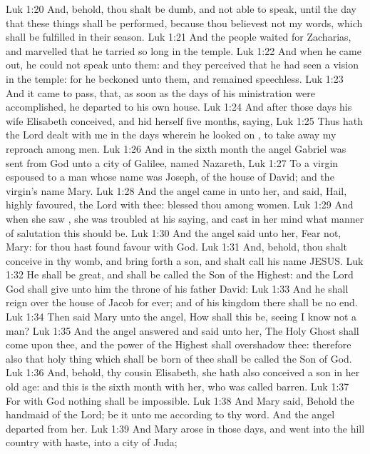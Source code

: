 \vs Luk 1:20 And, behold, thou shalt be dumb, and not able to speak, until the day that these things shall be performed, because thou believest not my words, which shall be fulfilled in their season.
\vs Luk 1:21 And the people waited for Zacharias, and marvelled that he tarried so long in the temple.
\vs Luk 1:22 And when he came out, he could not speak unto them: and they perceived that he had seen a vision in the temple: for he beckoned unto them, and remained speechless.
\vs Luk 1:23 And it came to pass, that, as soon as the days of his ministration were accomplished, he departed to his own house.
\vs Luk 1:24 And after those days his wife Elisabeth conceived, and hid herself five months, saying,
\vs Luk 1:25 Thus hath the Lord dealt with me in the days wherein he looked on , to take away my reproach among men.
\vs Luk 1:26 And in the sixth month the angel Gabriel was sent from God unto a city of Galilee, named Nazareth,
\vs Luk 1:27 To a virgin espoused to a man whose name was Joseph, of the house of David; and the virgin's name  Mary.
\vs Luk 1:28 And the angel came in unto her, and said, Hail,  highly favoured, the Lord  with thee: blessed  thou among women.
\vs Luk 1:29 And when she saw , she was troubled at his saying, and cast in her mind what manner of salutation this should be.
\vs Luk 1:30 And the angel said unto her, Fear not, Mary: for thou hast found favour with God.
\vs Luk 1:31 And, behold, thou shalt conceive in thy womb, and bring forth a son, and shalt call his name JESUS.
\vs Luk 1:32 He shall be great, and shall be called the Son of the Highest: and the Lord God shall give unto him the throne of his father David:
\vs Luk 1:33 And he shall reign over the house of Jacob for ever; and of his kingdom there shall be no end.
\vs Luk 1:34 Then said Mary unto the angel, How shall this be, seeing I know not a man?
\vs Luk 1:35 And the angel answered and said unto her, The Holy Ghost shall come upon thee, and the power of the Highest shall overshadow thee: therefore also that holy thing which shall be born of thee shall be called the Son of God.
\vs Luk 1:36 And, behold, thy cousin Elisabeth, she hath also conceived a son in her old age: and this is the sixth month with her, who was called barren.
\vs Luk 1:37 For with God nothing shall be impossible.
\vs Luk 1:38 And Mary said, Behold the handmaid of the Lord; be it unto me according to thy word. And the angel departed from her.
\vs Luk 1:39 And Mary arose in those days, and went into the hill country with haste, into a city of Juda;
